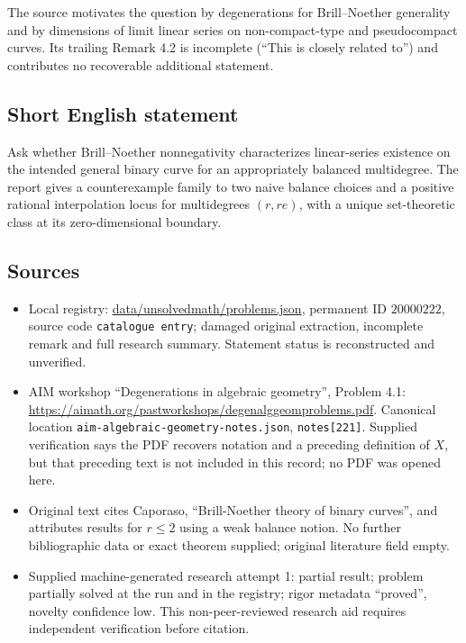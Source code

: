 \documentclass[11pt]{article}
\begin{document}
The source motivates the question by degenerations for Brill--Noether generality and by dimensions of limit linear series on non-compact-type and pseudocompact curves. Its trailing Remark 4.2 is incomplete (``This is closely related to'') and contributes no recoverable additional statement.
\subsection{Short English statement}
Ask whether Brill--Noether nonnegativity characterizes linear-series existence on the intended general binary curve for an appropriately balanced multidegree. The report gives a counterexample family to two naive balance choices and a positive rational interpolation locus for multidegrees $(r,re)$, with a unique set-theoretic class at its zero-dimensional boundary.
\subsection{Sources}
\begin{itemize}
\item Local registry: \url{data/unsolvedmath/problems.json}, permanent ID $20000222$, source code \texttt{catalogue entry}; damaged original extraction, incomplete remark and full research summary. Statement status is reconstructed and unverified.
\item AIM workshop ``Degenerations in algebraic geometry'', Problem 4.1: \url{https://aimath.org/pastworkshops/degenalggeomproblems.pdf}. Canonical location \texttt{aim-algebraic-geometry-notes.json}, \texttt{notes[221]}. Supplied verification says the PDF recovers notation and a preceding definition of $X$, but that preceding text is not included in this record; no PDF was opened here.
\item Original text cites Caporaso, ``Brill-Noether theory of binary curves'', and attributes results for $r\leq2$ using a weak balance notion. No further bibliographic data or exact theorem supplied; original literature field empty.
\item Supplied machine-generated research attempt 1: partial result; problem partially solved at the run and in the registry; rigor metadata ``proved'', novelty confidence low. This non-peer-reviewed research aid requires independent verification before citation.
\end{itemize}
\end{document}
